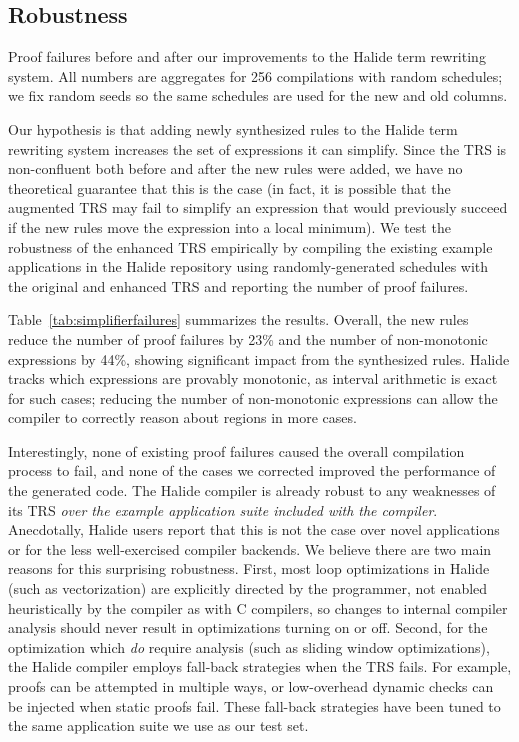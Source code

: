 \documentclass[sigplan,10pt,review,anonymous]{acmart}\settopmatter{printfolios=true,printccs=false,printacmref=false}
\begin{document}
\subsection{Robustness}
\begin{table}[!ht]
  \caption{Proof failures before and after our improvements to the Halide term rewriting system.
    All numbers are aggregates for 256 compilations with random schedules; we fix random seeds so
    the same schedules are used for the new and old columns.}
  \label{tab:simplifierfailures}
  \small
  
\end{table}

Our hypothesis is that adding newly synthesized rules to the Halide
term rewriting system increases the set of expressions it can simplify. Since the
TRS is non-confluent both before and after the new rules were added, we
have no theoretical guarantee that this is the case (in fact, it is possible
that the augmented TRS may fail to simplify an expression that would
previously succeed if the new rules move the expression into a local
minimum). We test the robustness of the enhanced TRS empirically by
compiling the existing example applications in the Halide repository
using randomly-generated schedules with the original and enhanced TRS
and reporting the number of proof failures.

Table~\ref{tab:simplifierfailures} summarizes the results.  Overall, the new rules
reduce the number of proof failures by 23\% and the number of non-monotonic expressions
by 44\%, showing significant impact from the synthesized rules.  Halide tracks
which expressions are provably monotonic, as interval arithmetic is exact for
such cases; reducing the number of non-monotonic expressions can allow the
compiler to correctly reason about regions in more cases.

Interestingly, none of existing proof failures caused the overall compilation process to fail, and none of the cases we corrected improved the performance of the generated code. %
The Halide compiler is already robust to any weaknesses of its TRS \emph{over the example application suite included with the compiler}. Anecdotally, Halide users report that this is not the case over novel applications or for the less well-exercised compiler backends. We believe there are two main reasons for this surprising robustness. First, most loop optimizations in Halide (such as vectorization) are explicitly directed by the programmer, not enabled heuristically by the compiler as with C compilers, so changes to internal compiler analysis should never result in optimizations turning on or off. Second, for the optimization which \emph{do} require analysis (such as sliding window optimizations), the Halide compiler employs fall-back strategies when the TRS fails. For example, proofs can be attempted in multiple ways, or low-overhead dynamic checks can be injected when static proofs fail. These fall-back strategies have been tuned to the same application suite we use as our test set.
\end{document}
